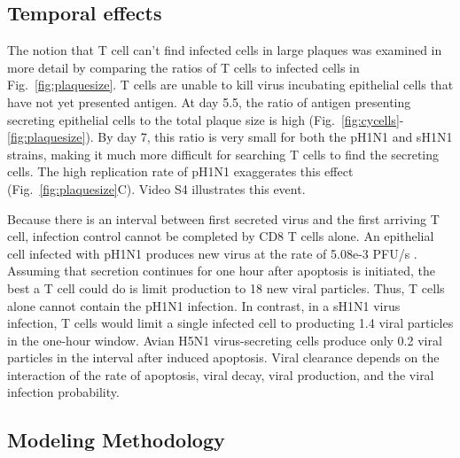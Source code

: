 \documentclass[10pt]{article}
\begin{document}
\subsection*{Temporal effects}

The notion that T cell can't find infected cells in large plaques was examined in more detail by comparing the ratios of T cells to infected cells in Fig.~\ref{fig:plaquesize}.  T cells are unable to kill virus incubating epithelial cells that have not yet presented antigen.  At day 5.5, the ratio of antigen presenting secreting epithelial cells to the total plaque size is high (Fig.~\ref{fig:cycells}-\ref{fig:plaquesize}). By day 7, this ratio is very small for both the pH1N1 and sH1N1 strains, making it much more difficult for searching T cells to find the secreting cells.  The high replication rate of pH1N1 exaggerates this effect (Fig.~\ref{fig:plaquesize}C).  Video S4 illustrates this event.

Because there is an interval between first secreted virus and the first arriving T cell, infection control cannot be completed by CD8 T cells alone.  An epithelial cell infected with pH1N1 produces new virus at the rate of 5.08e-3 PFU/s \cite{Mitchell2011}.  Assuming that secretion continues for one hour after apoptosis is initiated, the best a T cell could do is limit production to 18 new viral particles.  Thus, T cells alone cannot contain the pH1N1 infection.  In contrast, in a sH1N1 virus infection, T cells would limit a single infected cell to producting 1.4 viral particles in the one-hour window.  Avian H5N1 virus-secreting cells produce only 0.2 viral particles in the interval after induced apoptosis.  Viral clearance depends on the interaction of the rate of apoptosis, viral decay, viral production, and the viral infection probability.

\subsection*{Modeling Methodology}
\end{document}

